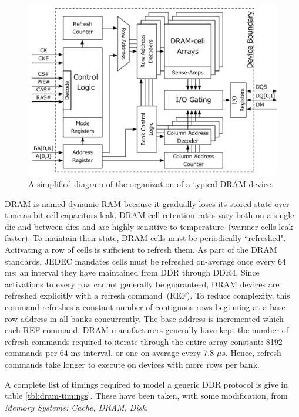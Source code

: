 \begin{figure}
	\centering
	\includegraphics[width=16cm]{figures/dram-device.pdf}
    \caption{A simplified diagram of the organization of a typical DRAM device.}
	\label{fig:dram-device}
\end{figure}

DRAM is named dynamic RAM because it gradually loses its stored state over time
as bit-cell capacitors leak. DRAM-cell retention rates vary both on a single
die and between dies and are highly sensitive to temperature~(warmer cells leak
faster). To maintain their state, DRAM cells must be periodically ``refreshed".
Activating a row of cells is sufficient to refresh them. As part of the DRAM
standards, JEDEC mandates cells must be refreshed on-average once every 64 ms;
an interval they have maintained from DDR through DDR4. Since activations to
every row cannot generally be guaranteed, DRAM devices are refreshed explicitly
with a refresh command~(REF). To reduce complexity, this command refreshes a
constant number of contiguous rows beginning at a base row address in all banks
concurrently.  The base address is incremented which each REF command. DRAM
manufacturers generally have kept the number of refresh commands required to
iterate through the entire array constant: 8192 commands per 64 ms interval, or
one on average every 7.8 $\mu s$.  Hence, refresh commands take longer to
execute on devices with more rows per bank.

A complete list of timings required to model a generic DDR protocol is give in
table \ref{tbl:dram-timings}. These have been taken, with some modification,
from \textit{Memory Systems: Cache, DRAM, Disk}\cite{drambook}.

